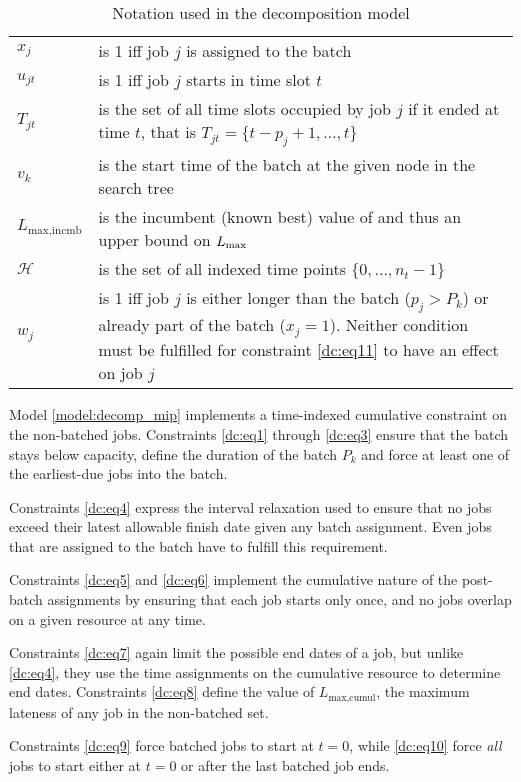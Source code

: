 \documentclass[13pt, letterpaper, oneside]{book}
\begin{document}
\begin{table}[h]
\begin{tabular}{l p{5in}}
$x_j$ & is 1 iff job $j$ is assigned to the batch \\
$u_{jt}$ & is 1 iff job $j$ starts in time slot $t$ \\
$T_{jt}$ & is the set of all time slots occupied by job $j$ if it ended at time
$t$, that is $T_{jt} = \{t - p_j + 1, \dots, t\}$ \\
$v_k$ & is the start time of the batch at the given node in the search tree \\
$L_{\text{max,incmb}}$ & is the incumbent (known best) value of and thus an
upper bound on $L_{\text{max}}$ \\
$\mathcal{H}$ & is the set of all indexed time points $\{0, \dots, n_t - 1\}$ \\
$w_j$ & is 1 iff job $j$ is either longer than the batch ($p_j > P_k$) or
already part of the batch ($x_j = 1$). Neither condition must be fulfilled for constraint
\eqref{dc:eq11} to have an effect on job $j$
\end{tabular}
\caption{Notation used in the decomposition model}
\end{table}

Model \ref{model:decomp_mip} implements a time-indexed cumulative constraint on the
non-batched jobs. Constraints \eqref{dc:eq1} through \eqref{dc:eq3} ensure that the
batch stays below capacity, define the duration of the batch $P_k$ and force at
least one of the earliest-due jobs into the batch.

Constraints \eqref{dc:eq4} express the interval relaxation used to ensure that no
jobs exceed their latest allowable finish date given any batch assignment. Even
jobs that are assigned to the batch have to fulfill this requirement.

Constraints \eqref{dc:eq5} and \eqref{dc:eq6} implement the cumulative nature of the
post-batch assignments by ensuring that each job starts only once, and no jobs
overlap on a given resource at any time.

Constraints \eqref{dc:eq7} again limit the possible end dates of a
job, but unlike \eqref{dc:eq4}, they use the time assignments on the cumulative
resource to determine end dates. Constraints \eqref{dc:eq8} define the value of
$L_{\text{max,cumul}}$, the maximum lateness of any job in the non-batched set.

Constraints \eqref{dc:eq9} force batched jobs to start at $t = 0$, while
\eqref{dc:eq10} force \textit{all} jobs to start either at $t = 0$ or after the
last batched job ends.
\end{document}
